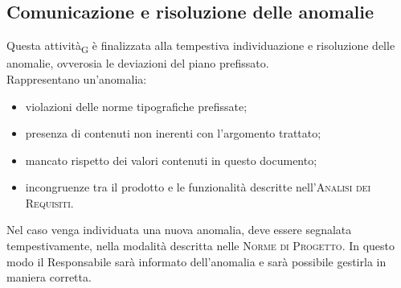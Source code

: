 \subsection{Comunicazione e risoluzione delle anomalie}

Questa attività\textsubscript{G} è finalizzata alla tempestiva individuazione e risoluzione delle anomalie, ovverosia le deviazioni del piano prefissato.\\ Rappresentano un'anomalia:
\begin{itemize}
    \item violazioni delle norme tipografiche prefissate;
    \item presenza di contenuti non inerenti con l'argomento trattato;
    \item mancato rispetto dei valori contenuti in questo documento;
    \item incongruenze tra il prodotto e le funzionalità descritte nell'\textsc{Analisi dei Requisiti}.
\end{itemize}
Nel caso venga individuata una nuova anomalia, deve essere segnalata tempestivamente, nella modalità descritta nelle \textsc{Norme di Progetto}. In questo modo il Responsabile sarà informato dell'anomalia e sarà possibile gestirla in maniera corretta.
